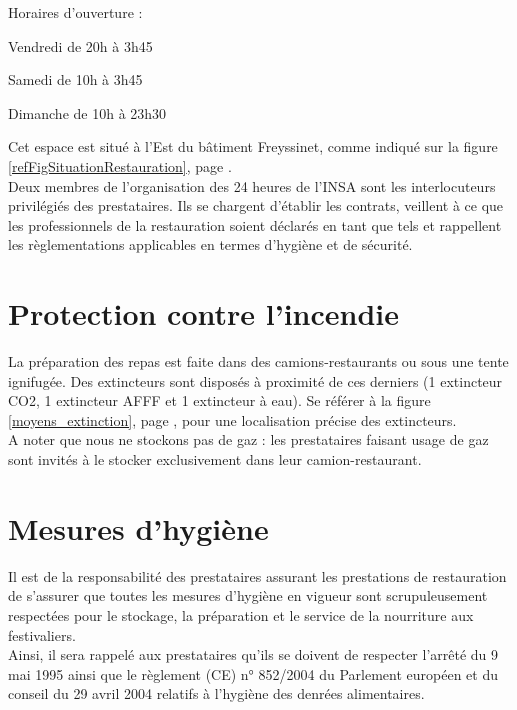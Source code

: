 \documentclass[hidelinks, paper=a4, fontsize=13pt]{report}
\begin{document}
Horaires d’ouverture :
\begin{list}{•}{}
	\item Vendredi de 20h à 3h45
	\item Samedi de 10h à 3h45
	\item Dimanche de 10h à 23h30
	
\end{list}

Cet espace est situé à l'Est du bâtiment Freyssinet, comme indiqué sur la figure \ref{refFigSituationRestauration}, page \pageref{refFigSituationRestauration}.\\


Deux membres de l’organisation des 24 heures de l’INSA sont les interlocuteurs privilégiés des prestataires. Ils se chargent d'établir les contrats, veillent à ce que les professionnels de la restauration soient déclarés en tant que tels et rappellent les règlementations applicables en termes d'hygiène et de sécurité.\\

\section{Protection contre l’incendie}

La préparation des repas est faite dans des camions-restaurants ou sous une tente ignifugée. Des extincteurs sont disposés à proximité de ces derniers (1 extincteur CO2, 1 extincteur AFFF et 1 extincteur à eau). Se référer à la figure \ref{moyens_extinction}, page \pageref{moyens_extinction}, pour une localisation précise des extincteurs.\\ 

A noter que nous ne stockons pas de gaz : les prestataires faisant usage de gaz sont invités à le stocker exclusivement dans leur camion-restaurant.

\section{Mesures d’hygiène}

Il est de la responsabilité des prestataires assurant les prestations de restauration de s'assurer que toutes les mesures d'hygiène en vigueur sont scrupuleusement respectées pour le stockage, la préparation et le service de la nourriture aux festivaliers.\\

Ainsi, il sera rappelé aux prestataires qu'ils se doivent de respecter l'arrêté du 9 mai 1995 ainsi que le règlement (CE) n° 852/2004 du Parlement européen et du conseil du 29 avril 2004 relatifs à l'hygiène des denrées alimentaires.\\
\end{document}
